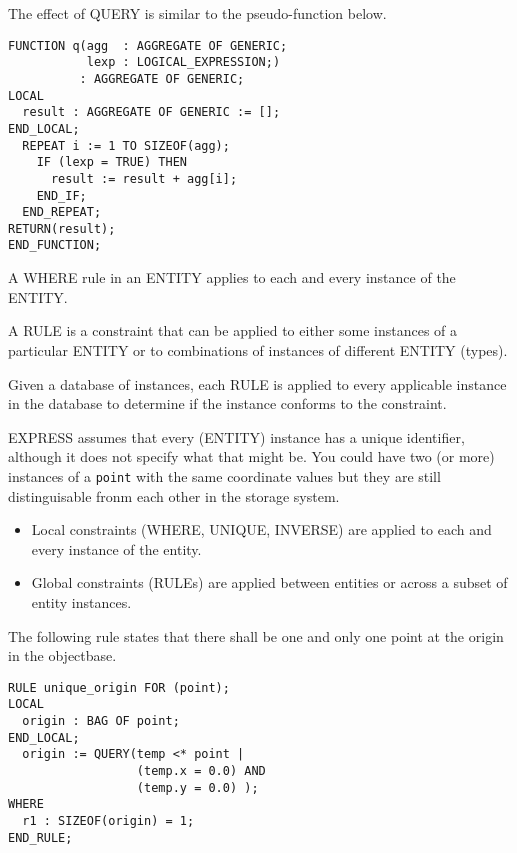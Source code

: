 
    The effect of QUERY is similar to the pseudo-function below.
\begin{verbatim}
FUNCTION q(agg  : AGGREGATE OF GENERIC;
           lexp : LOGICAL_EXPRESSION;) 
          : AGGREGATE OF GENERIC;
LOCAL
  result : AGGREGATE OF GENERIC := [];
END_LOCAL;
  REPEAT i := 1 TO SIZEOF(agg);
    IF (lexp = TRUE) THEN
      result := result + agg[i];
    END_IF;
  END_REPEAT;
RETURN(result);
END_FUNCTION;
\end{verbatim}

\begin{remarks}
\remintro


A WHERE rule in an ENTITY applies to each and every instance of the ENTITY.

A RULE is a constraint that can be applied to either some instances of
a particular ENTITY or to combinations of instances of different ENTITY 
(types).


    Given a database of instances, each RULE is applied to every applicable
instance in the database to determine if the instance conforms to the 
constraint.

    EXPRESS assumes that every (ENTITY) instance has a unique identifier, 
although it does not specify what that might be. You could have two (or more)
instances of a \texttt{point} with the same coordinate values but they are 
still distinguisable fronm each other in the storage system.

\remend
\end{remarks}


\begin{itemize}
\item Local constraints (WHERE, UNIQUE, INVERSE) are applied to each and every
instance of the entity.
\item Global constraints (RULEs) are applied between entities or across a
subset of entity instances.
\end{itemize}
The following rule states that there shall be one and only one point at the
origin in the objectbase.
\begin{verbatim}
RULE unique_origin FOR (point);
LOCAL
  origin : BAG OF point;
END_LOCAL;
  origin := QUERY(temp <* point |
                  (temp.x = 0.0) AND
                  (temp.y = 0.0) ); 
WHERE
  r1 : SIZEOF(origin) = 1;
END_RULE;
\end{verbatim}


